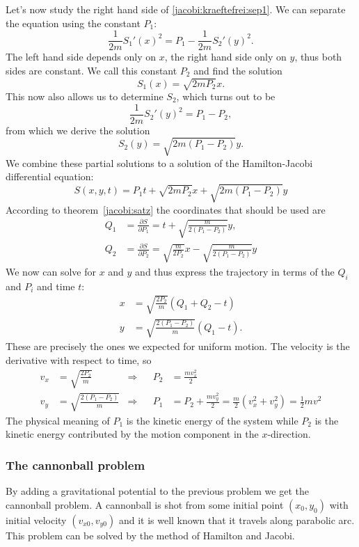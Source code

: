 Let's now study the right hand side of \eqref{jacobi:kraeftefrei:sep1}.
We can separate the equation using the constant $P_1$:
\[
\frac1{2m} S_1'(x)^2
=
P_1-\frac1{2m}S_2'(y)^2.
\]
The left hand side depends only on $x$, the right hand side only on $y$,
thus both sides are constant.
We call this constant $P_2$ and find the solution
\[
S_1(x)
=
\sqrt{2mP_2}x.
\]
This now also allows us to determine $S_2$, which turns out to be
\[
\frac1{2m} S_2'(y)^2
=P_1-P_2,
\]
from which we derive the solution
\[
S_2(y)
=
\sqrt{2m(P_1-P_2)}y.
\]
We combine these partial solutions to a solution of the Hamilton-Jacobi
differential equation:
\[
S(x,y,t)=
P_1t
+
\sqrt{2mP_2}x
+
\sqrt{2m(P_1-P_2)}y
\]
According to theorem~\ref{jacobi:satz} the coordinates that should be used
are
\begin{align*}
Q_1&=\frac{\partial S}{\partial P_1}
=
t + \sqrt{\frac{m}{2(P_1-P_2)}}y,\\
Q_2&=\frac{\partial S}{\partial P_2}
=
\sqrt{\frac{m}{2P_2}}x
-
\sqrt{\frac{m}{2(P_1-P_2)}}y
\end{align*}
We now can solve for $x$ and $y$ and thus express the trajectory
in terms of the $Q_i$ and $P_i$ and time $t$:
\begin{align*}
x&=\sqrt{\frac{2P_2}{m}}(Q_1+Q_2-t)\\
y&=\sqrt{\frac{2(P_1-P_2)}{m}}(Q_1-t).
\end{align*}
These are precisely the ones we expected for uniform motion.
The velocity is the derivative with respect to time, so
\begin{align*}
v_x
&=
\sqrt{\frac{2P_2}{m}}
&\Rightarrow&&
P_2&=\frac{mv_x^2}2
\\
v_y
&=
\sqrt{\frac{2(P_1-P_2)}{m}}
&\Rightarrow&&
P_1&=P_2+\frac{mv_y^2}2=\frac{m}2(v_x^2+v_y^2)=\frac12mv^2
\end{align*}
The physical meaning of $P_1$ is the kinetic energy of the system
while $P_2$ is the kinetic energy contributed by the motion component
in the $x$-direction.

\subsubsection{The cannonball problem}
By adding a gravitational potential to the previous problem we
get the cannonball problem.
A cannonball is shot from some initial point $(x_0,y_0)$  with
initial velocity $(v_{x0},v_{y0})$ and it is well known that 
it travels along parabolic arc.
This problem can be solved by the method of Hamilton and Jacobi.

